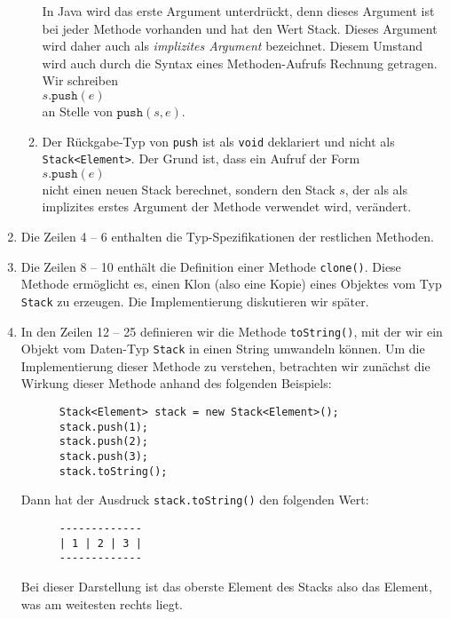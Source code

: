 \begin{enumerate}
\begin{enumerate}
            In Java wird das erste Argument unterdr\"uckt, denn dieses Argument ist bei
            jeder Methode vorhanden und hat den Wert Stack.  Dieses Argument wird daher
            auch als \emph{implizites Argument} bezeichnet.  Diesem Umstand wird auch
            durch die Syntax eines Methoden-Aufrufs Rechnung getragen.  Wir schreiben \\[0.1cm]
            \hspace*{1.3cm} $s.\mathtt{push}(e)$ \\[0.1cm]
            an Stelle von $\mathtt{push}(s,e)$.
      \item Der R\"uckgabe-Typ von \texttt{push} ist als \texttt{void} deklariert und nicht
            als \texttt{Stack<Element>}.  Der Grund ist, dass ein Aufruf der Form \\[0.1cm]
            \hspace*{1.3cm} $s.\mathtt{push}(e)$
            \\[0.1cm]
            nicht einen neuen Stack berechnet, sondern den Stack $s$, der als als
            implizites erstes Argument der Methode verwendet wird, ver\"andert.
      \end{enumerate}
\item Die Zeilen 4 -- 6 enthalten die Typ-Spezifikationen der restlichen Methoden.
\item Die Zeilen 8 -- 10 enth\"alt die Definition einer Methode \texttt{clone()}.
      Diese Methode erm\"oglicht es, einen Klon (also eine Kopie) eines Objektes vom Typ
      \texttt{Stack} zu erzeugen.  Die Implementierung diskutieren wir sp\"ater.
\item In den Zeilen 12 -- 25 definieren wir die Methode \texttt{toString()}, mit der wir
      ein Objekt vom Daten-Typ \texttt{Stack} in einen String umwandeln k\"onnen.  Um die
      Implementierung dieser Methode zu verstehen, betrachten wir zun\"achst die Wirkung
      dieser Methode anhand des folgenden Beispiels: 
      \begin{verbatim}
      Stack<Element> stack = new Stack<Element>();
      stack.push(1);
      stack.push(2);
      stack.push(3);
      stack.toString();
      \end{verbatim}
      \vspace*{-0.5cm}

      Dann hat der Ausdruck \texttt{stack.toString()} den folgenden Wert:
      \begin{verbatim}
      -------------
      | 1 | 2 | 3 |
      -------------
      \end{verbatim}
      \vspace*{-0.5cm}
      Bei dieser Darstellung ist das oberste Element des Stacks also das Element, was am
      weitesten rechts liegt.


\end{enumerate}
